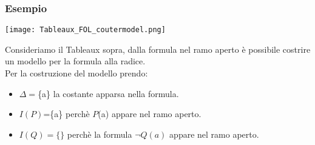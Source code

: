 \documentclass[../main.tex]{subfiles}
\begin{document}
   \subsubsection{Esempio}
   \begin{center}
      \texttt{[image: Tableaux\_FOL\_coutermodel.png]}
   \end{center}
   Consideriamo il Tableaux sopra, dalla formula nel ramo aperto è possibile costrire un modello per la formula alla radice.\\
   Per la costruzione del modello prendo:
   \begin{itemize}
      \item $\Delta=$\{a\} la costante apparsa nella formula.
      \item $I(P)$=\{a\} perchè $P$(a) appare nel ramo aperto.
      \item $I(Q)=\{\}$ perchè la formula $\lnot Q(a)$ appare nel ramo aperto.
   \end{itemize}
\end{document}
